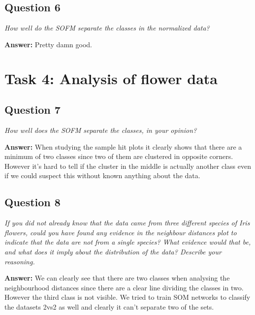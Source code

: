\documentclass[a4paper]{article}
\begin{document}
\subsection*{Question 6}
\emph{How well do the SOFM separate the classes in the normalized
data?}

\textbf{Answer:} 
Pretty damn good.

\section*{Task 4: Analysis of flower data}

\subsection*{Question 7}
\emph{How well does the SOFM separate the classes, in your opinion?}

\textbf{Answer: } When studying the sample hit plots it clearly shows that there are a minimum of two classes since two of them are clustered in opposite corners. However it's hard to tell if the cluster in the middle is actually another class even if we could suspect this without known anything about the data.


\subsection*{Question 8}
\emph{If you did not already know that the data came from three different species of Iris flowers, could you have found any evidence in the neighbour distances plot to indicate that the data are not from a single species? What evidence would that be, and what does it imply about the distribution of the data?
Describe your reasoning.}

\textbf{Answer:} We can clearly see that there are two classes when analysing the neighbourhood distances since there are a clear line dividing the classes in two. However the third class is not visible. We tried to train SOM networks to classify the datasets 2vs2 as well and clearly it can't separate two of the sets.


\end{document}
